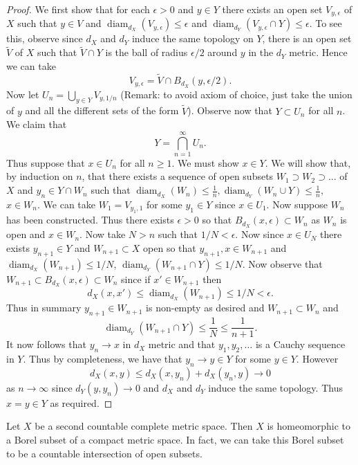 \documentclass[twoside, a4paper, 10pt]{amsart}
\begin{document}
\begin{proof} We first show that for each $\epsilon>0$ and $y \in Y$ there exists an open set $V_{y,\epsilon}$ of $X$ such that $y \in V$ and $\operatorname{diam}_{d_X}(V_{y,\epsilon}) \leq \epsilon$ and $\operatorname{diam}_{d_Y}(V_{y,\epsilon} \cap Y) \leq \epsilon$. To see this, observe since $d_X$ and $d_Y$ induce the same topology on $Y$, there is an open set $\tilde{V}$ of $X$ such that $\tilde{V} \cap Y$ is the ball of radius $\epsilon/2$ around $y$ in the $d_Y$ metric. Hence we can take $$V_{y, \epsilon} = \tilde{V} \cap B_{d_X}(y, \epsilon/2).$$ Now let $U_n = \bigcup_{y \in Y} V_{y,1/n}$ (Remark: to avoid axiom of choice, just take the union of $y$ and all the different sets of the form $\tilde{V}$). Observe now that $Y \subset U_n$ for all $n$. 
We claim that $$Y = \bigcap_{n = 1}^{\infty} U_n.$$ Thus suppose that $x \in U_n$ for all $n \geq 1$. We must show $x \in Y$. We will show that, by induction on $n$, that there exists a sequence of open subsets $W_1 \supset W_2 \supset \ldots$ of $X$  and $y_n \in Y \cap W_n$ such that $\operatorname{diam}_{d_X}(W_n) \leq \frac{1}{n}, \operatorname{diam}_{d_Y}(W_n \cup Y) \leq \frac{1}{n}$, $x \in W_n$. 
We can take $W_1 = V_{y_1,1}$ for some $y_1 \in Y$ since $x \in U_1$. Now suppose $W_n$ has been constructed. Thus there exists $\epsilon>0$ so that $B_{d_X}(x, \epsilon) \subset W_n$ as $W_n$ is open and $x \in W_n$. Now take $N>n$ such that $1/N< \epsilon$. 
Now since $x \in U_N$ there exists $y_{n+1} \in Y$ and $W_{n+1} \subset X$ open so that $y_{n+1}, x \in W_{n+1}$ and $\operatorname{diam}_{d_X}(W_{n+1}) \leq 1/N$, $\operatorname{diam}_{d_Y}(W_{n+1} \cap Y) \leq 1/N$. 
Now observe that $W_{n+1} \subset B_{d_X}(x, \epsilon) \subset W_n$ since if $x' \in W_{n+1}$ then $$d_X(x,x') \leq \operatorname{diam}_{d_X}(W_{n+1}) \leq 1/N < \epsilon.$$ 
Thus in summary $y_{n+1} \in W_{n+1}$ is non-empty as desired and $W_{n+1} \subset W_n$ and $$\operatorname{diam}_{d_Y}(W_{n+1} \cap Y) \leq \frac{1}{N} \leq \frac{1}{n+1}.$$ 
It now follows that $y_n \to x$ in $d_X$ metric and that $y_1,y_2, \ldots$ is a Cauchy sequence in $Y$. Thus by completeness, we have that $y_n \to y \in Y$ for some $y \in Y$. However $$d_X(x,y) \leq d_X(x,y_n) + d_X(y_n,y) \to 0$$ as $n \to \infty$ since $d_Y(y,y_n) \to 0$ and $d_X$ and $d_Y$ induce the same topology. Thus $x=y \in Y$ as required.\end{proof}

\begin{corol}\label{corol: embedding Polish into compact} Let $X$ be a second countable complete metric space. Then $X$ is homeomorphic to a Borel subset of a compact metric space. In fact, we can take this Borel subset to be a countable intersection of open subsets.

\end{corol}
\end{document}

